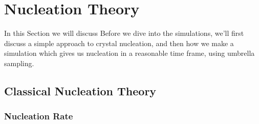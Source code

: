 \documentclass[thesis]{subfiles}
\begin{document}
\section{Nucleation Theory}

In this Section we will discuss 
Before we dive into the simulations, we'll first discuss a simple approach to crystal nucleation, and then how we make a simulation which gives us nucleation in a reasonable time frame, using umbrella sampling.

\subsection{Classical Nucleation Theory}\label{subsec:cnt}

\begin{comment} %
The simplest model of nucleation is well known, and goes by the name of classical nucleation theory (CNT). The theory applies when we have a system in a \emph{metastable} state. Heuristically it is as follows. The entire system of interest is in state $A$ with a chemical potential $\mu_A$, but under current conditions (due to e.g. pressure, density) the Gibbs free energy of the system would be lower in state $B$, with a chemical potential $\mu_B < \mu_A$. However, by changing a droplet in the system from state $A$ to state $B$, we create an interface with surface tension $\gamma > 0$ between state $A$ and state $B$. CNT asserts that a droplet is spherical (which makes sense, as this gives the most volume for the least area), so the energy change from a droplet at a radius $r$ will be	
\begin{equation}
	\Delta G(r) = 4\pi r^2 \gamma - \frac{4\pi r^3 \Delta\mu}{3},
\end{equation}
where $\Delta\mu = \mu_A - \mu_B > 0$. Naturally, if making the droplet larger makes this energy cost is greater, i.e. if $\frac{d\Delta G(r)}{dr} > 0$, %
then the system will, in order to minimize the Gibbs free energy, make the droplet smaller. However, because $r^3$ grows faster than $r^2$, at sufficiently high $r$ the bulk energy gain will overtake the surface energy cost. This can be easily calculated by setting the derivative to zero, and we find the critical droplet radius
\begin{equation}
	r^* = \frac{2\gamma}{\Delta\mu}.
\end{equation}
This results in an energy barrier of 
\begin{equation}
	\Delta G (r^*) = \frac{16 \pi \gamma^3}{3 \Delta\mu^2}.
\end{equation}
\end{comment}
\subsubsection{Nucleation Rate}
\end{document}
